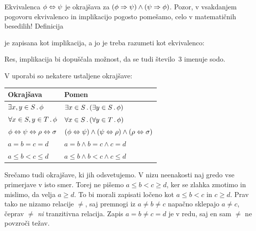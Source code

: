 Ekvivalenca $\phi \Leftrightarrow \psi$ je okrajšava za
%
$
  (\phi \Rightarrow \psi) \land (\psi \Rightarrow \phi)
$.
%
Pozor, v vsakdanjem pogovoru ekvivalenco in implikacijo pogosto pomešamo, celo v matematičnih besedilih! Definicija
%
\begin{quote}
\end{quote}
%
je zapisana kot implikacija, a jo je treba razumeti kot ekvivalenco:
%
\begin{quote}
\end{quote}
%
Res, implikacija bi dopuščala možnost, da se tudi število~$3$ imenuje sodo.

V uporabi so nekatere ustaljene okrajšave:
%
\begin{center}
  \small
  \begin{tabular}{ll}
    \toprule
    Okrajšava & Pomen \\ \midrule
    $\exists x,y \in S \,.\, \phi$
    &
    $\exists x \in S \,.\, (\exists y \in S \,.\, \phi)$
    \\
    $\forall x \in S, y \in T \,.\, \phi$
    &
    $\forall x \in S \,.\,(\forall y \in T \,.\, \phi)$
    \\
    $\phi \Leftrightarrow \psi \Leftrightarrow \rho \Leftrightarrow \sigma$ \qquad\qquad\hbox{}
    &
    $(\phi \Leftrightarrow \psi) \land (\psi \Leftrightarrow \rho) \land (\rho \Leftrightarrow \sigma)$
    \\
    $a = b = c = d$
    &
    $a = b \land b = c \land c = d$
    \\
    $a \leq b < c \leq d$
    &
    $a \leq b \land b < c \land c \leq d$
    \\
    \bottomrule
  \end{tabular}
\end{center}
%
Srečamo tudi okrajšave, ki jih odsvetujemo.
%
V nizu neenakosti naj gredo vse primerjave v isto smer. Torej ne pišemo $a \leq b < c \geq d$, ker se zlahka zmotimo in
mislimo, da velja $a \geq d$. To bi morali zapisati ločeno kot $a \leq b < c$ in $c \geq d$. Prav tako ne nizamo
relacije $\neq$, saj premnogi iz $a \neq b \neq c$ napačno sklepajo $a \neq c$, čeprav $\neq$ \emph{ni} tranzitivna
relacija. Zapis $a = b \neq c = d$ je v redu, saj en sam $\neq$ ne povzroči težav.

